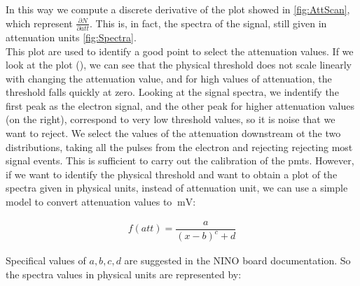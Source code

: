 In this way we compute a discrete derivative of the plot showed in \ref{fig:AttScan}, which represent $\frac{\partial N}{\partial att}$. This is, in fact, the spectra of the signal, still given in attenuation units \ref{fig:Spectra}.\\
This plot are used to identify a good point to select the attenuation values. If we look at the plot (), we can see that the physical threshold does not scale linearly with changing the attenuation value, and for high values of attenuation, the threshold falls quickly at zero. Looking at the signal spectra, we indentify the first peak as the electron signal, and the other peak for higher attenuation values (on the right), correspond to very low threshold values, so it is noise that we want to reject. We select the values of the attenuation downstream ot the two distributions, taking all the pulses from the electron and rejecting rejecting most signal events. This is sufficient to carry out the calibration of the pmts. However, if we want to identify the physical threshold and want to obtain a plot of the spectra given in physical units, instead of attenuation unit, we can use a simple model to convert attenuation values to $\SI{}{\milli \volt}$:

\begin{align*}
f(att) = \dfrac{a}{(x - b)^{c} + d}
\end{align*} 

Specifical values of $a,b,c,d$ are suggested in the NINO board documentation. So the spectra values in physical units are represented by: 

